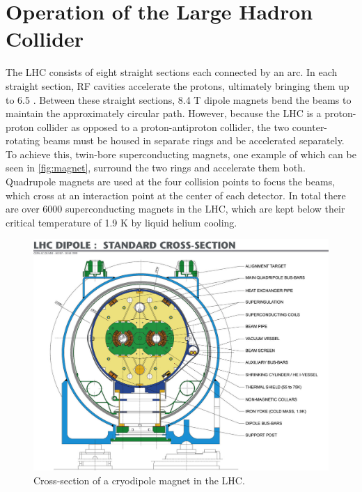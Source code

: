 \section{Operation of the Large Hadron Collider}

The \ac{LHC} consists of eight straight sections each connected by an arc. In each straight section, \ac{RF} cavities accelerate the protons, ultimately bringing them up to 6.5 \gev. Between these straight sections, 8.4 T dipole magnets bend the beams to maintain the approximately circular path. However, because the \ac{LHC} is a proton-proton collider as opposed to a proton-antiproton collider, the two counter-rotating beams must be housed in separate rings and be accelerated separately. To achieve this, twin-bore superconducting magnets, one example of which can be seen in \autoref{fig:magnet}, surround the two rings and accelerate them both. Quadrupole magnets are used at the four collision points to focus the beams, which cross at an interaction point at the center of each detector. In total there are over 6000 superconducting magnets in the \ac{LHC}, which are kept below their critical temperature of 1.9 K by liquid helium cooling. 

\begin{centering}
\begin{figure}[!hbt]
\myfloatalign
\includegraphics[width=.90\linewidth]{figures/lhc/magnet.jpg}
\caption{Cross-section of a cryodipole magnet in the \ac{LHC}.}
\label{fig:magnet}
\end{figure}
\end{centering}

